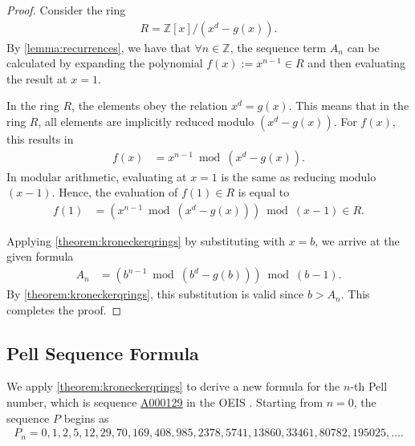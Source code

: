 \documentclass[12pt]{article}
\theoremstyle{plain}
\theoremstyle{definition}
\newcommand{\seqnum}[1]{\href{https://oeis.org/#1}{\rm \underline{#1}}}
\begin{document}
\begin{proof}
Consider the ring
\begin{align*}
    R = \mathbb{Z}[x]/(x^d-g(x)) .
\end{align*}
By \cref{lemma:recurrences}, we have that $\forall n \in \mathbb{Z}$, the sequence term $A_n$ can be calculated by expanding the polynomial $f(x) := x^{n-1} \in R$ and then evaluating the result at $x=1$.

In the ring $R$, the elements obey the relation $x^d = g(x)$. This means that in the ring $R$, all elements are implicitly reduced modulo $(x^d - g(x))$. For $f(x)$, this results in 
\begin{align*}
    f(x) &= x^{n-1} \bmod{(x^d - g(x))} .
\end{align*}
In modular arithmetic, evaluating at $x=1$ is the same as reducing modulo $(x-1)$. Hence, the evaluation of $f(1) \in R$ is equal to
\begin{align*}
    f(1) &= \left(x^{n-1} \bmod{(x^d - g(x))}\right) \bmod{(x-1)} \in R .
\end{align*}

Applying \cref{theorem:kroneckerqrings} by substituting with $x = b$, we arrive at the given formula
\begin{align*}
    A_n &= \left(b^{n-1} \bmod{(b^d - g(b))}\right) \bmod{(b-1)} .
\end{align*}
By \cref{theorem:kroneckerqrings}, this substitution is valid since $b > A_n$. This completes the proof.
\end{proof}

\subsection{Pell Sequence Formula}
We apply \cref{theorem:kroneckerqrings} to derive a new formula for the $n$-th Pell number, which is sequence \seqnum{A000129} in the OEIS \cite{A000129}. Starting from $n=0$, the sequence $P$ begins as
\begin{align*}
    P_n = 0, 1, 2, 5, 12, 29, 70, 169, 408, 985, 2378, 5741, 13860, 33461, 80782, 195025, \ldots .
\end{align*}
\end{document}
